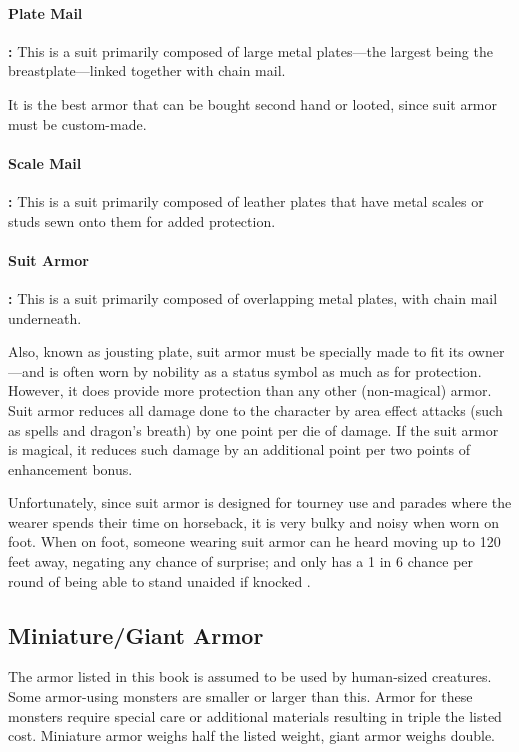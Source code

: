 \begin{multicols*}{2}
\paragraph{Plate Mail}\textbf{:} This is a suit primarily composed of large metal plates—the largest being the breastplate—linked together with chain mail.

It is the best armor that can be bought second hand or looted, since suit armor must be custom-made.

\paragraph{Scale Mail}\textbf{:} This is a suit primarily composed of leather plates that have metal scales or studs sewn onto them for added protection.

\paragraph{Suit Armor}\textbf{:} This is a suit primarily composed of overlapping metal plates, with chain mail underneath.

Also, known as jousting plate, suit armor must be specially made to fit its owner—and is often worn by nobility as a status symbol as much as for protection. However, it does provide more protection than any other (non-magical) armor. Suit armor reduces all damage done to the character by area effect attacks (such as  spells and dragon’s breath) by one point per die of damage. If the suit armor is magical, it reduces such damage by an additional point per two points of enhancement bonus.

Unfortunately, since suit armor is designed for tourney use and parades where the wearer spends their time on horseback, it is very bulky and noisy when worn on foot. When on foot, someone wearing suit armor can he heard moving up to 120 feet away, negating any chance of surprise; and only has a 1 in 6 chance per round of being able to stand unaided if knocked .

\subsection{Miniature/Giant Armor}
The armor listed in this book is assumed to be used by human-sized creatures. Some armor-using monsters are smaller or larger than this. Armor for these monsters require special care or additional materials resulting in triple the listed cost. Miniature armor weighs half the listed weight, giant armor weighs double.


\end{multicols*}
